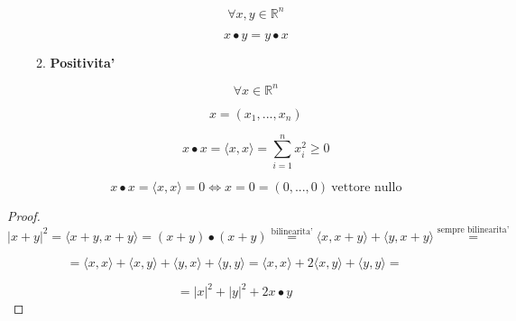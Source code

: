 \documentclass[11pt]{article}
\begin{document}
\begin{itemize}
\begin{enumerate}
                \[
                    \forall x,y \in \mathbb{R}^{n}
                \]

                \[
                    x \bullet y = y \bullet x
                \]

            \item \textbf{Positivita'} 
                
                \[
                    \forall x \in  \mathbb{R}^{n}
                \]

                \[
                    x=(x_1,...,x_n)
                \]

                \[
                    x \bullet x = \langle x,x \rangle = \sum^{n}_{i=1} x_i^{2}\ge 0
                \]

                \[
                    x \bullet x = \langle x,x \rangle = 0 \Leftrightarrow x = 0 = (0,...,0)\ \text{vettore nullo}
                \]

        \end{enumerate}



           
\end{itemize}

\newpage


\begin{proof}
       \[
           |x+ y| ^{2} = \langle x+y , x+y \rangle = (x+y) \bullet (x+y) \overset{\text{bilinearita'}}{=} \langle x,x+y \rangle + \langle y,x+y \rangle \overset{\text{sempre bilinearita'}}{=} 
       \]    

       \[
           =\langle x,x \rangle + \langle x,y \rangle + \langle y,x \rangle + \langle y,y \rangle = \langle x,x \rangle + 2\langle x,y \rangle + \langle y,y \rangle= 
       \]

       \[
            = |x|^{2} + |y|^{2} + 2x \bullet y
       \]
\end{proof}
\end{document}
